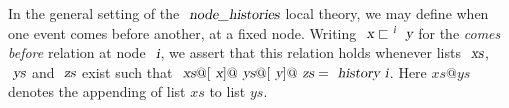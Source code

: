 \documentclass[acmlarge,review,anonymous]{acmart}\settopmatter{printfolios=true}
\begin{document}
In the general setting of the $\isa{node{\isacharunderscore}histories}$ local theory, we may define when one event comes before another, at a fixed node.
Writing $\isa{x} \sqsubset^\isa{i} \isa{y}$ for the \emph{comes before} relation at node $\isa{i}$, we assert that this relation holds whenever lists $\isa{xs}$, $\isa{ys}$ and $\isa{zs}$ exist such that $\isa{xs}@[\isa{x}]@\isa{ys}@[\isa{y}]@\isa{zs} = \isa{history\ i}$.
Here $xs@ys$ denotes the appending of list $xs$ to list $ys$.
\end{document}
